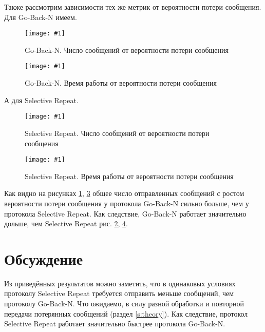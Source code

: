 \documentclass[a4paper,12pt]{article}
\newcommand{\plot}[3]{
    \begin{figure}[H]
        \begin{center}
            \texttt{[image: \#1]}
            \caption{#2}
            \label{#3}
        \end{center}
    \end{figure}
}
\begin{document}
    Также рассмотрим зависимости тех же метрик от вероятности потери сообщения.
    Для Go-Back-N имеем.

    \plot{sizeRateGBNMessageNum}{Go-Back-N. Число сообщений от вероятности потери сообщения}{p:sizeRateGBNMessageNum}
    \plot{sizeRateGBNWorkingTime}{Go-Back-N. Время работы от вероятности потери сообщения}{p:sizeRateGBNWorkingTime}

    А для Selective Repeat.
    
    \plot{sizeRateSRPMessageNum}{Selective Repeat. Число сообщений от вероятности потери сообщения}{p:sizeRateSRPMessageNum}
    \plot{sizeRateSRPWorkingTime}{Selective Repeat. Время работы от вероятности потери сообщения}{p:sizeRateSRPWorkingTime}

    Как видно на рисунках \ref{p:sizeRateGBNMessageNum}, \ref{p:sizeRateSRPMessageNum} общее число отправленных сообщений с ростом вероятности потери сообщения
    у протокола Go-Back-N сильно больше, чем у протокола Selective Repeat. Как следствие, Go-Back-N работает значительно дольше, чем Selective Repeat рис. \ref{p:sizeRateGBNWorkingTime}, \ref{p:sizeRateSRPWorkingTime}. 

    \section{Обсуждение}
    Из приведённых результатов можно заметить, что в одинаковых условиях протоколу Selective Repeat требуется отправить меньше сообщений, чем протоколу Go-Back-N.
    Что ожидаемо, в силу разной обработки и повторной передачи потерянных сообщений (раздел \ref{s:theory}).
    Как следствие, протокол Selective Repeat работает значительно быстрее протокола Go-Back-N.
\end{document}
